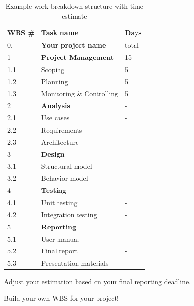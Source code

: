 \documentclass[12pt, a4paper]{report}
\begin{document}
\begin{table}[htb!]
    \begin{center}
        \begin{tabular}{l|l|l}
        \textbf{WBS \#} & \textbf{Task name} & \textbf{Days} \\
        \hline

        \hline
        0. & \textbf{Your project name} & total\\
        \hline
        1 & \textbf{Project Management} & 15\\
        1.1 & Scoping & 5\\
        1.2 & Planning & 5\\
        1.3 & Monitoring \& Controlling & 5\\
        \hline
        2 & \textbf{Analysis} & -\\
        2.1 & Use cases & - \\
        2.2 & Requirements & - \\
        2.3 & Architecture & - \\
        \hline
        3 & \textbf{Design} & -\\
        3.1 & Structural model & -\\
        3.2 & Behavior model & -\\
        \hline
        4 & \textbf{Testing} & -\\
        4.1 & Unit testing & -\\
        4.2 & Integration testing & - \\
        \hline
        5 & \textbf{Reporting} & -\\
        5.1 & User manual & -\\
        5.2 & Final report & -\\
        5.3 & Presentation materials & -\\
        \hline

        \hline
        \end{tabular}
    \end{center}
    \caption{Example work breakdown structure with time estimate}
    \label{tab:wbs}
\end{table}

Adjust your estimation based on your final reporting deadline.

Build your own WBS for your project!
\end{document}
